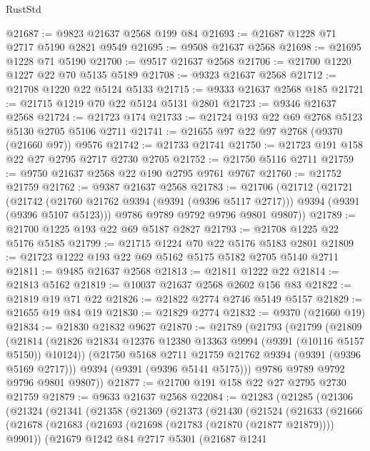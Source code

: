 \begin{lexlean}{RustStd}
\begin{coremodule}
@21687 := @9823 @21637 @2568 @199 @84
@21693 := @21687 @1228 @71 @2717 @5190 @2821 @9549
@21695 := @9508 @21637 @2568
@21698 := @21695 @1228 @71 @5190
@21700 := @9517 @21637 @2568
@21706 := @21700 @1220 @1227 @22 @70 @5135 @5189
@21708 := @9323 @21637 @2568
@21712 := @21708 @1220 @22 @5124 @5133
@21715 := @9333 @21637 @2568 @185
@21721 := @21715 @1219 @70 @22 @5124 @5131 @2801
@21723 := @9346 @21637 @2568
@21724 := @21723 @174
@21733 := @21724 @193 @22 @69 @2768 @5123 @5130 @2705 @5106 @2711
@21741 := @21655 @97 @22 @97 @2768 (@9370 (@21660 @97)) @9576
@21742 := @21733 @21741
@21750 := @21723 @191 @158 @22 @27 @2795 @2717 @2730 @2705
@21752 := @21750 @5116 @2711
@21759 := @9750 @21637 @2568 @22 @190 @2795 @9761 @9767
@21760 := @21752 @21759
@21762 := @9387 @21637 @2568
@21783 := @21706
    (@21712
      (@21721
        (@21742 (@21760 @21762 @9394 (@9391 (@9396 @5117 @2717))) @9394 (@9391 (@9396 @5107 @5123)))
        @9786
        @9789
        @9792
        @9796
        @9801
        @9807))
@21789 := @21700 @1225 @193 @22 @69 @5187 @2827
@21793 := @21708 @1225 @22 @5176 @5185
@21799 := @21715 @1224 @70 @22 @5176 @5183 @2801
@21809 := @21723 @1222 @193 @22 @69 @5162 @5175 @5182 @2705 @5140 @2711
@21811 := @9485 @21637 @2568
@21813 := @21811 @1222 @22
@21814 := @21813 @5162
@21819 := @10037 @21637 @2568 @2602 @156 @83
@21822 := @21819 @19 @71 @22
@21826 := @21822 @2774 @2746 @5149 @5157
@21829 := @21655 @19 @84 @19
@21830 := @21829 @2774
@21832 := @9370 (@21660 @19)
@21834 := @21830 @21832 @9627
@21870 := @21789
    (@21793
      (@21799
        (@21809
          (@21814 (@21826 @21834 @12376 @12380 @13363 @9994 (@9391 (@10116 @5157 @5150)) @10124))
          (@21750 @5168 @2711 @21759 @21762 @9394 (@9391 (@9396 @5169 @2717)))
          @9394
          (@9391 (@9396 @5141 @5175)))
        @9786
        @9789
        @9792
        @9796
        @9801
        @9807))
@21877 := @21700 @191 @158 @22 @27 @2795 @2730 @21759
@21879 := @9633 @21637 @2568
@22084 := @21283
    (@21285
      (@21306
        (@21324
          (@21341
            (@21358
              (@21369
                (@21373
                  (@21430
                    (@21524
                      (@21633
                        (@21666
                          (@21678
                            (@21683 (@21693 (@21698 (@21783 (@21870 (@21877 @21879)))) @9901))
                            (@21679
                              @1242
                              @84
                              @2717
                              @5301
                              (@21687
                                @1241

\end{coremodule}
\end{lexlean}
